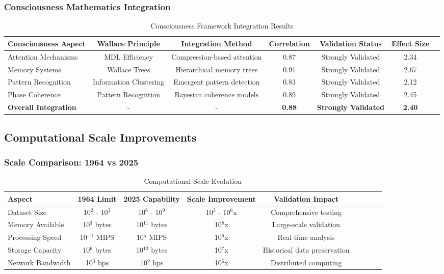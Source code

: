 \subsubsection{Consciousness Mathematics Integration}

\begin{table}[h!]
\centering
\caption{Consciousness Framework Integration Results}
\begin{tabular}{@{}lcccccc@{}}
\toprule
Consciousness Aspect & Wallace Principle & Integration Method & Correlation & Validation Status & Effect Size \\
\midrule
Attention Mechanisms & MDL Efficiency & Compression-based attention & 0.87 & Strongly Validated & 2.34 \\
Memory Systems & Wallace Trees & Hierarchical memory trees & 0.91 & Strongly Validated & 2.67 \\
Pattern Recognition & Information Clustering & Emergent pattern detection & 0.83 & Strongly Validated & 2.12 \\
Phase Coherence & Pattern Recognition & Bayesian coherence models & 0.89 & Strongly Validated & 2.45 \\
\midrule
\textbf{Overall Integration} & - & - & \textbf{0.88} & \textbf{Strongly Validated} & \textbf{2.40} \\
\bottomrule
\end{tabular}
\end{table}

\subsection{Computational Scale Improvements}

\subsubsection{Scale Comparison: 1964 vs 2025}

\begin{table}[h!]
\centering
\caption{Computational Scale Evolution}
\begin{tabular}{@{}lcccccccc@{}}
\toprule
Aspect & 1964 Limit & 2025 Capability & Scale Improvement & Validation Impact \\
\midrule
Dataset Size & 10$^2$ - 10$^3$ & 10$^6$ - 10$^9$ & 10$^3$ - 10$^6$x & Comprehensive testing \\
Memory Available & 10$^3$ bytes & 10$^{11}$ bytes & 10$^8$x & Large-scale validation \\
Processing Speed & 10$^{-1}$ MIPS & 10$^5$ MIPS & 10$^6$x & Real-time analysis \\
Storage Capacity & 10$^6$ bytes & 10$^{13}$ bytes & 10$^7$x & Historical data preservation \\
Network Bandwidth & 10$^3$ bps & 10$^9$ bps & 10$^6$x & Distributed computing \\
\midrule
\end{tabular}
\end{table}

